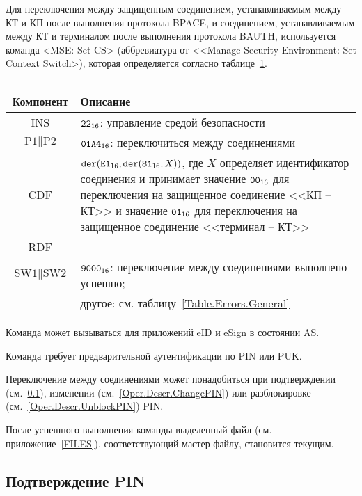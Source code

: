 Для переключения между защищенным соединением,
устанавливаемым между КТ и КП после выполнения 
протокола BPACE, и соединением, 
устанавливаемым между КТ и терминалом после выполнения 
протокола BAUTH, используется 
команда <MSE: Set CS> (аббревиатура от <<Manage Security Environment: Set 
Context Switch>),
которая определяется согласно 
таблице~\ref{Table.Oper.SetCSCmd}.

\begin{table}[hbt]
\caption{}\label{Table.Oper.SetCSCmd}
\begin{tabular}{|c|p{14cm}|}
\hline
Компонент & Описание \\
\hline
\hline
INS & $\texttt{22}_{16}$: управление средой безопасности\\ 
\hline
$\text{P1} \parallel\text{P2}$ & $\texttt{01A4}_{16}$: 
переключиться между соединениями \\
\hline
CDF & 
$\texttt{der}(\texttt{E1}_{16}, \texttt{der}(\texttt{81}_{16}, X))$, 
где $X$ определяет идентификатор
соединения и принимает значение $\texttt{00}_{16}$ для
переключения на защищенное соединение <<КП -- КТ>>
и значение $\texttt{01}_{16}$ для переключения на защищенное
соединение <<терминал -- КТ>>\\ 
\hline 
RDF &  --- \\
\hline
$\text{SW1} \parallel \text{SW2}$ & 
$\texttt{9000}_{16}$: переключение между соединениями выполнено успешно; \\
 & другое: см. таблицу~\ref{Table.Errors.General} \\
\hline
\end{tabular}
\end{table}

Команда может вызываться для приложений eID и eSign
в состоянии AS.

Команда требует предварительной аутентификации по PIN или PUK.

Переключение между соединениями может понадобиться
при подтверждении (см.~\ref{Oper.Descr.VerifyPIN}), 
изменении (см.~\ref{Oper.Descr.ChangePIN})
или разблокировке (см.~\ref{Oper.Descr.UnblockPIN}) PIN.

После успешного выполнения команды выделенный файл (см.
приложение~\ref{FILES}), 
соответствующий мастер-файлу, становится текущим.

\subsection{Подтверждение PIN}
\label{Oper.Descr.VerifyPIN}

